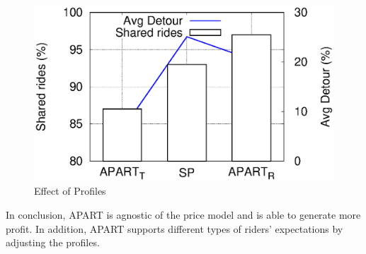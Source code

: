 \begin{figure}[h]
	\centering
    \includegraphics[width = 0.65\columnwidth]{fig/quality.eps}
    \vspace{-0.15in}
    \caption{Effect of Profiles}
    \label{fig:quality}
\end{figure}
\vspace{-0.1in}

In conclusion, APART is agnostic of the price model and is able to generate more profit. In addition, APART supports different types of riders' expectations by adjusting the profiles.